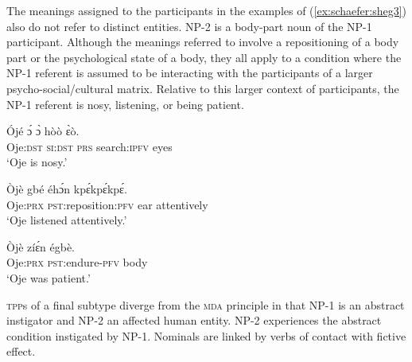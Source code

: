 \documentclass[output=paper,colorlinks,citecolor=brown
]{langscibook}
\begin{document}
The meanings assigned to the participants in the examples of (\ref{ex:schaefer:sheg3}) also do not refer to distinct entities. NP-2 is a body-part noun of the NP-1 participant. Although the meanings referred to involve a repositioning of a body part or the psychological state of a body, they all apply to a condition where the NP-1 referent is assumed to be interacting with the participants of a larger psycho-social/cultural matrix. Relative to this larger context of participants, the NP-1 referent is nosy, listening, or being patient.  

 \ea \label{ex:schaefer:sheg3}
\begin{xlist}
\ex \label{ex:schaefer:sheg3a}
\gll Ójé ɔ́ ɔ̀ hòò ɛ̀ò. \\
            Oje:\textsc{dst} \textsc{si:dst} \textsc{prs}	search:\textsc{ipfv}	eyes \\
           \glt  ‘Oje is nosy.’

    \ex \label{ex:schaefer:sheg3b}
     \gll Òjè gbé éhɔ́n kpɛ́kpɛ́kpɛ́. \\
        Oje:\textsc{prx}   \textsc{pst}:reposition:\textsc{pfv} ear attentively \\
        \glt ‘Oje listened attentively.’

    \ex \label{ex:schaefer:sheg3c}
        \gll Òjè zíɛ́n égbè.
        \\
        Oje:\textsc{prx}   \textsc{pst}:endure-\textsc{pfv} body
        \\
        \glt ‘Oje was patient.’
    
\end{xlist}
\z										

\textsc{tpp}s of a final subtype diverge from the \textsc{mda} principle in that NP-1 is an abstract instigator and NP-2 an affected human entity. NP-2 experiences the abstract condition instigated by NP-1. Nominals are linked by verbs of contact with fictive effect. 
\end{document}
